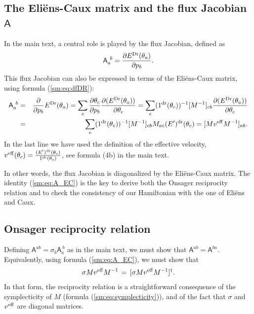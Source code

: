 \documentclass[twocolumn,amsfonts,showpacs,superscriptaddress]{revtex4-1}
\begin{document}
\begin{widetext}
\subsection{The Eli\"ens-Caux matrix and the flux Jacobian $\mathsf A$}

In the main text, a central role is played by the flux Jacobian, defined as
\begin{equation}\label{sm:eq:A_EC}
	\mathsf A_{a}^{~b} = \frac{\partial E^{\rm Dr} (\theta_a)}{\partial p_b}  .
\end{equation}
This flux Jacobian can also be expressed in terms of the Eli\"ens-Caux matrix, using formula (\ref{sm:eq:dfDR}):
\begin{eqnarray}
\nonumber	\mathsf A_{a}^{~b}  &=& \frac{ \partial }{\partial p_b} E^{\rm Dr}(\theta_a) 
=  \sum_c \frac{ \partial \theta_c }{\partial p_b}  \frac{\partial ( E^{\rm Dr}(\theta_a) ) }{\partial \theta_c} 
=  \sum_c    (1^{\rm dr}(\theta_c))^{-1} [M^{-1}]_{cb}  \frac{\partial (E^{\rm Dr}(\theta_a))}{\partial \theta_c}   \\
	&=&  \sum_c    (1^{\rm dr}(\theta_c))^{-1} [M^{-1}]_{cb}  M_{ac}  (E')^{\rm dr} (\theta_c) 
	= [M v^{\rm eff} M^{-1}]_{ab}.
\end{eqnarray}
In the last line we have used the definition of the effective velocity, $v^{\rm eff}(\theta_c) = \frac{(E')^{\rm dr} (\theta_c)}{ 1^{\rm dr} (\theta_c) }$, see formula (4b) in the main text.

In other words, the flux Jacobian is diagonalized by the Eli\"ens-Caux matrix. The identity (\ref{sm:eq:A_EC}) is the key to derive both the Onsager reciprocity relation and to check the consistency of our Hamiltonian with the one of Eli\"ens and Caux.





\subsection{Onsager reciprocity relation}

Defining $\mathsf A^{ab} = \sigma_b \mathsf A_a^{~b}$ as in the main text, we must show that $\mathsf A^{ab}  = \mathsf A^{ba}$. Equivalently, using formula (\ref{sm:eq:A_EC}), we must show that
\begin{equation}
	\sigma  M v^{\rm eff} M^{-1} \, = \, [ \sigma M v^{\rm eff} M^{-1} ]^\dagger .
\end{equation}
In that form, the reciprocity relation is a straightforward consequence of the symplecticity of $M$ (formula (\ref{sm:eq:symplecticity})), and of the fact that $\sigma$ and $v^{\rm eff}$ are diagonal matrices.




\end{widetext}
\end{document}
